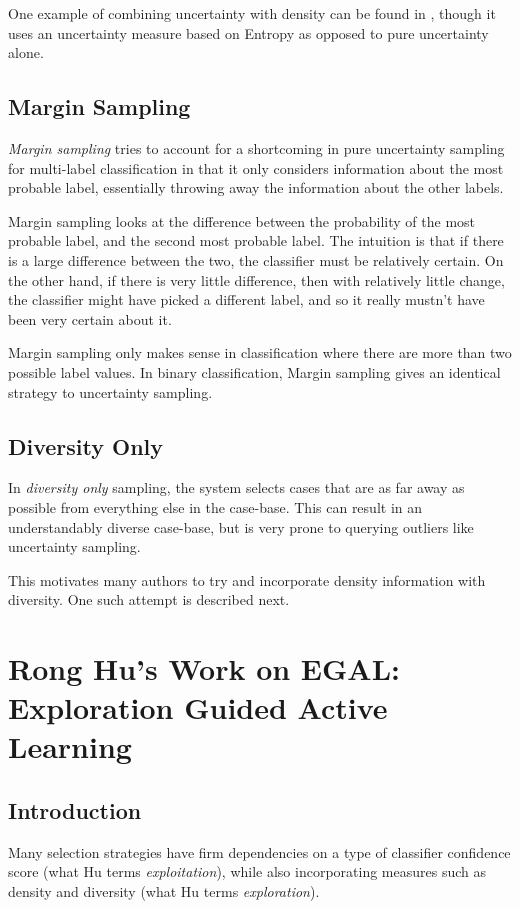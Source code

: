 \documentclass[a4paper,11pt]{report}
\begin{document}
One example of combining uncertainty with density can be found in \citet{Zhu2008}, though it uses an uncertainty measure based on Entropy as opposed to pure uncertainty alone.

\subsection{Margin Sampling}

\emph{Margin sampling} tries to account for a shortcoming in pure uncertainty sampling for multi-label classification in that it only considers information about the most probable label, essentially throwing away the information about the other labels.

Margin sampling looks at the difference between the probability of the most probable label, and the second most probable label. The intuition is that if there is a large difference between the two, the classifier must be relatively certain. On the other hand, if there is very little difference, then with relatively little change, the classifier might have picked a different label, and so it really mustn't have been very certain about it.

Margin sampling only makes sense in classification where there are more than two possible label values. In binary classification, Margin sampling gives an identical strategy to uncertainty sampling.

\subsection{Diversity Only}
In \emph{diversity only} sampling, the system selects cases that are as far away as possible from everything else in the case-base. This can result in an understandably diverse case-base, but is very prone to querying outliers like uncertainty sampling.

This motivates many authors to try and incorporate density information with diversity. One such attempt is described next.

\section{Rong Hu's Work on EGAL: Exploration Guided Active Learning}
\subsection{Introduction}
Many selection strategies have firm dependencies on a type of classifier confidence score (what Hu terms \emph{exploitation}), while also incorporating measures such as density and diversity (what Hu terms \emph{exploration}).
\end{document}
